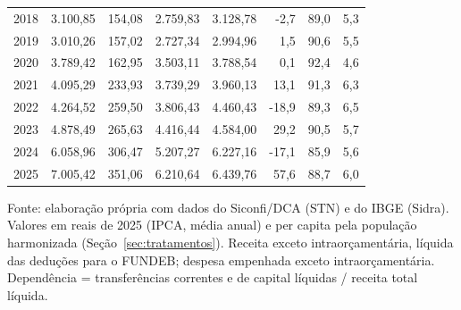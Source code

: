 \begin{table}[htbp]
\begin{tabular}{lrrrrrrr}
2018 & 3.100,85 & 154,08 & 2.759,83 & 3.128,78 & -2,7 & 89,0 & 5,3\\
2019 & 3.010,26 & 157,02 & 2.727,34 & 2.994,96 & 1,5 & 90,6 & 5,5\\
2020 & 3.789,42 & 162,95 & 3.503,11 & 3.788,54 & 0,1 & 92,4 & 4,6\\
2021 & 4.095,29 & 233,93 & 3.739,29 & 3.960,13 & 13,1 & 91,3 & 6,3\\
2022 & 4.264,52 & 259,50 & 3.806,43 & 4.460,43 & -18,9 & 89,3 & 6,5\\
2023 & 4.878,49 & 265,63 & 4.416,44 & 4.584,00 & 29,2 & 90,5 & 5,7\\
2024 & 6.058,96 & 306,47 & 5.207,27 & 6.227,16 & -17,1 & 85,9 & 5,6\\
2025 & 7.005,42 & 351,06 & 6.210,64 & 6.439,76 & 57,6 & 88,7 & 6,0\\
\bottomrule
\end{tabular}
\par\smallskip
\begin{minipage}{0.97\textwidth}\scriptsize
Fonte: elaboração própria com dados do Siconfi/DCA (STN) e do IBGE (Sidra). Valores em reais de 2025 (IPCA, média anual) e per capita pela população harmonizada (Seção~\ref{sec:tratamentos}). Receita exceto intraorçamentária, líquida das deduções para o FUNDEB; despesa empenhada exceto intraorçamentária. Dependência = transferências correntes e de capital líquidas / receita total líquida.
\end{minipage}
\end{table}
